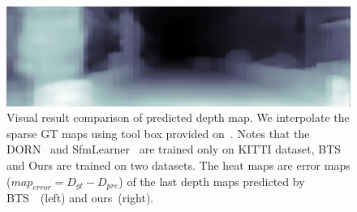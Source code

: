 \documentclass{svjour3}                     %
\begin{document}
\begin{figure}[t]
{\begin{minipage}[b]{0.15\linewidth}
  \includegraphics[width=1\linewidth]{images/kitti_result/2011_09_30_drive_0018_sync_0000000642.png}
  \end{minipage}}
  \caption{Visual result comparison of predicted depth map. We interpolate 
  the sparse GT maps using tool box provided on~\cite{nyu-toolbox}. Notes that the DORN~\cite{FuCVPR18-DORN} and SfmLearner~\cite{zhou2017unsupervised} are trained only on KITTI dataset, BTS~\cite{bts} and Ours are trained on two datasets. The heat maps are error maps ($map_{error} = D_{gt} - D_{pre}$) of the last depth maps predicted by BTS~\cite{bts}~(left) and ours~(right). }
  \label{KITTI visualization result}
  \end{figure}
\end{document}
